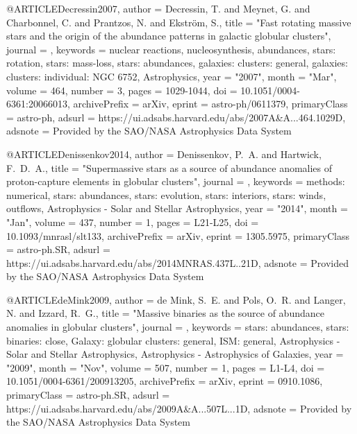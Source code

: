 \documentclass[twocolumn,tighten]{aastex63}
\begin{document}
{@ARTICLE{Decressin2007,
       author = {{Decressin}, T. and {Meynet}, G. and {Charbonnel}, C. and
         {Prantzos}, N. and {Ekstr{\"o}m}, S.},
        title = "{Fast rotating massive stars and the origin of the abundance patterns in galactic globular clusters}",
      journal = {\aap},
     keywords = {nuclear reactions, nucleosynthesis, abundances, stars: rotation, stars: mass-loss, stars: abundances, galaxies: clusters: general, galaxies: clusters: individual: NGC 6752, Astrophysics},
         year = "2007",
        month = "Mar",
       volume = {464},
       number = {3},
        pages = {1029-1044},
          doi = {10.1051/0004-6361:20066013},
archivePrefix = {arXiv},
       eprint = {astro-ph/0611379},
 primaryClass = {astro-ph},
       adsurl = {https://ui.adsabs.harvard.edu/abs/2007A&A...464.1029D},
      adsnote = {Provided by the SAO/NASA Astrophysics Data System}
}

@ARTICLE{Denissenkov2014,
       author = {{Denissenkov}, P.~A. and {Hartwick}, F.~D.~A.},
        title = "{Supermassive stars as a source of abundance anomalies of proton-capture elements in globular clusters}",
      journal = {\mnras},
     keywords = {methods: numerical, stars: abundances, stars: evolution, stars: interiors, stars: winds, outflows, Astrophysics - Solar and Stellar Astrophysics},
         year = "2014",
        month = "Jan",
       volume = {437},
       number = {1},
        pages = {L21-L25},
          doi = {10.1093/mnrasl/slt133},
archivePrefix = {arXiv},
       eprint = {1305.5975},
 primaryClass = {astro-ph.SR},
       adsurl = {https://ui.adsabs.harvard.edu/abs/2014MNRAS.437L..21D},
      adsnote = {Provided by the SAO/NASA Astrophysics Data System}
}

@ARTICLE{deMink2009,
       author = {{de Mink}, S.~E. and {Pols}, O.~R. and {Langer}, N. and {Izzard}, R.~G.},
        title = "{Massive binaries as the source of abundance anomalies in globular clusters}",
      journal = {\aap},
     keywords = {stars: abundances, stars: binaries: close, Galaxy: globular clusters: general, ISM: general, Astrophysics - Solar and Stellar Astrophysics, Astrophysics - Astrophysics of Galaxies},
         year = "2009",
        month = "Nov",
       volume = {507},
       number = {1},
        pages = {L1-L4},
          doi = {10.1051/0004-6361/200913205},
archivePrefix = {arXiv},
       eprint = {0910.1086},
 primaryClass = {astro-ph.SR},
       adsurl = {https://ui.adsabs.harvard.edu/abs/2009A&A...507L...1D},
      adsnote = {Provided by the SAO/NASA Astrophysics Data System}
}

}
\end{document}
